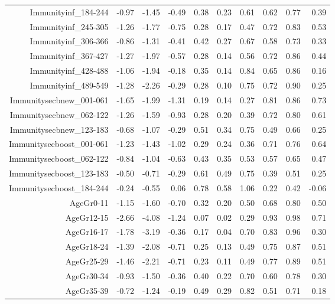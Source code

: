 \begin{table}[ht]
\begin{tabular}{rrrrrrrrrr}
  Immunityinf\_184-244 & -0.97 & -1.45 & -0.49 & 0.38 & 0.23 & 0.61 & 0.62 & 0.77 & 0.39 \\ 
  Immunityinf\_245-305 & -1.26 & -1.77 & -0.75 & 0.28 & 0.17 & 0.47 & 0.72 & 0.83 & 0.53 \\ 
  Immunityinf\_306-366 & -0.86 & -1.31 & -0.41 & 0.42 & 0.27 & 0.67 & 0.58 & 0.73 & 0.33 \\ 
  Immunityinf\_367-427 & -1.27 & -1.97 & -0.57 & 0.28 & 0.14 & 0.56 & 0.72 & 0.86 & 0.44 \\ 
  Immunityinf\_428-488 & -1.06 & -1.94 & -0.18 & 0.35 & 0.14 & 0.84 & 0.65 & 0.86 & 0.16 \\ 
  Immunityinf\_489-549 & -1.28 & -2.26 & -0.29 & 0.28 & 0.10 & 0.75 & 0.72 & 0.90 & 0.25 \\ 
  Immunitysecbnew\_001-061 & -1.65 & -1.99 & -1.31 & 0.19 & 0.14 & 0.27 & 0.81 & 0.86 & 0.73 \\ 
  Immunitysecbnew\_062-122 & -1.26 & -1.59 & -0.93 & 0.28 & 0.20 & 0.39 & 0.72 & 0.80 & 0.61 \\ 
  Immunitysecbnew\_123-183 & -0.68 & -1.07 & -0.29 & 0.51 & 0.34 & 0.75 & 0.49 & 0.66 & 0.25 \\ 
  Immunitysecboost\_001-061 & -1.23 & -1.43 & -1.02 & 0.29 & 0.24 & 0.36 & 0.71 & 0.76 & 0.64 \\ 
  Immunitysecboost\_062-122 & -0.84 & -1.04 & -0.63 & 0.43 & 0.35 & 0.53 & 0.57 & 0.65 & 0.47 \\ 
  Immunitysecboost\_123-183 & -0.50 & -0.71 & -0.29 & 0.61 & 0.49 & 0.75 & 0.39 & 0.51 & 0.25 \\ 
  Immunitysecboost\_184-244 & -0.24 & -0.55 & 0.06 & 0.78 & 0.58 & 1.06 & 0.22 & 0.42 & -0.06 \\ 
  AgeGr0-11 & -1.15 & -1.60 & -0.70 & 0.32 & 0.20 & 0.50 & 0.68 & 0.80 & 0.50 \\ 
  AgeGr12-15 & -2.66 & -4.08 & -1.24 & 0.07 & 0.02 & 0.29 & 0.93 & 0.98 & 0.71 \\ 
  AgeGr16-17 & -1.78 & -3.19 & -0.36 & 0.17 & 0.04 & 0.70 & 0.83 & 0.96 & 0.30 \\ 
  AgeGr18-24 & -1.39 & -2.08 & -0.71 & 0.25 & 0.13 & 0.49 & 0.75 & 0.87 & 0.51 \\ 
  AgeGr25-29 & -1.46 & -2.21 & -0.71 & 0.23 & 0.11 & 0.49 & 0.77 & 0.89 & 0.51 \\ 
  AgeGr30-34 & -0.93 & -1.50 & -0.36 & 0.40 & 0.22 & 0.70 & 0.60 & 0.78 & 0.30 \\ 
  AgeGr35-39 & -0.72 & -1.24 & -0.19 & 0.49 & 0.29 & 0.82 & 0.51 & 0.71 & 0.18 \\ 

\end{tabular}
\end{table}
